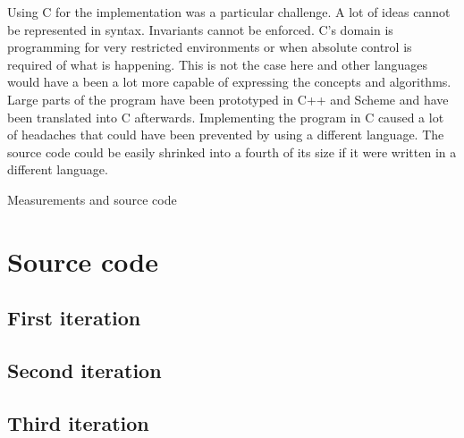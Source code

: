 \documentclass[11pt,a4paper]{article}
\begin{document}
Using C for the implementation was a particular challenge.
A lot of ideas cannot be represented in syntax. Invariants cannot be
enforced. C's domain is programming for very restricted environments
or when absolute control is required of what is happening.
This is not the case here and other languages would have a been a lot
more capable of expressing the concepts and algorithms.
Large parts of the program have been prototyped in C++ and Scheme and
have been translated into C afterwards.
Implementing the program in C caused a lot of headaches that could
have been prevented by using a different language.
The source code could be easily shrinked into a fourth of its size if
it were written in a different language.




\FloatBarrier
\clearpage
\huge{Measurements and source code}

\section{Source code}
\label{sec:src}
\subsection{First iteration}



\subsection{Second iteration}



\subsection{Third iteration}


\end{document}
